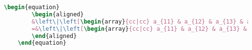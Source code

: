 \begin{lstlisting}[language=TeX]
    \begin{equation}
        \begin{aligned}
        &\left\|\left[\begin{array}{cc|cc} a_{11} & a_{12} & a_{13} & a_{14} \\ a_{21} & a_{22} & a_{23} & a_{24} \\ \hline a_{31} & a_{32} & a_{33} & a_{34} \\ a_{41} & a_{42} & a_{43} & a_{44} \\ \hline a_{51} & a_{52} & a_{53} & a_{54} \\ a_{61} & a_{62} & a_{63} & a_{64} \\ \end{array}\right]-\left[\begin{array}{cc} b_{11} & b_{12} \\ b_{21} & b_{22} \\ b_{31} & b_{32} \\ \end{array}\right]\otimes\left[\begin{array}{cc} c_{11} & c_{12} \\ c_{21} & c_{22} \\ \end{array}\right]\right\|_{F} \\
        =&\left\|\left[\begin{array}{cc|cc} a_{11} & a_{12} & a_{13} & a_{14} \\ a_{21} & a_{22} & a_{23} & a_{24} \\ \hline a_{31} & a_{32} & a_{33} & a_{34} \\ a_{41} & a_{42} & a_{43} & a_{44} \\ \hline a_{51} & a_{52} & a_{53} & a_{54} \\ a_{61} & a_{62} & a_{63} & a_{64} \\ \end{array}\right]-\left[\begin{array}{c} b_{11} \\ b_{21} \\ b_{31} \\ b_{12} \\ b_{22} \\ b_{32} \\ \end{array}\right]\otimes\left[\begin{array}{cccc} c_{11} & c_{21} & c_{12} & c_{22} \\ \end{array}\right]\right\|_{F}
        \end{aligned}
    \end{equation}
\end{lstlisting}
